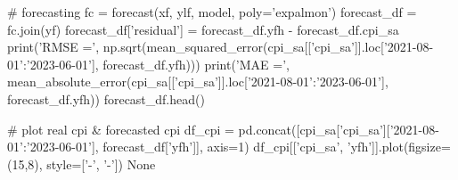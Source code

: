 \documentclass[a4paper, 14pt]{extarticle}
\begin{document}
\begin{python}
		# forecasting
		fc = forecast(xf, ylf, model, poly='expalmon')
		forecast_df = fc.join(yf)
		forecast_df['residual'] = forecast_df.yfh - forecast_df.cpi_sa
		print('RMSE =', np.sqrt(mean_squared_error(cpi_sa[['cpi_sa']].loc['2021-08-01':'2023-06-01'], forecast_df.yfh)))
		print('MAE =', mean_absolute_error(cpi_sa[['cpi_sa']].loc['2021-08-01':'2023-06-01'], forecast_df.yfh))
		forecast_df.head()
		
		# plot real cpi & forecasted cpi
		df_cpi = pd.concat([cpi_sa['cpi_sa']['2021-08-01':'2023-06-01'], forecast_df['yfh']], axis=1)
		df_cpi[['cpi_sa', 'yfh']].plot(figsize=(15,8), style=['-', '-'])
		None
	\end{python}
\end{document}
